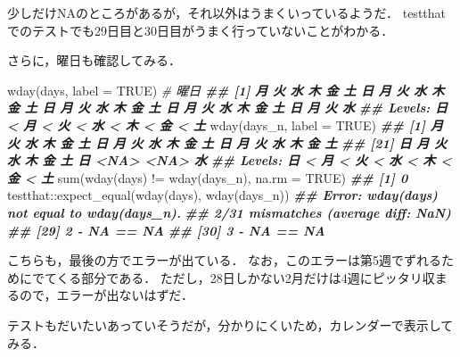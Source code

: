 \documentclass[
]{article}
\newenvironment{Shaded}{\begin{snugshade}}{\end{snugshade}}
\newcommand{\AttributeTok}[1]{\textcolor[rgb]{0.77,0.63,0.00}{#1}}
\newcommand{\CommentTok}[1]{\textcolor[rgb]{0.56,0.35,0.01}{\textit{#1}}}
\newcommand{\ConstantTok}[1]{\textcolor[rgb]{0.00,0.00,0.00}{#1}}
\newcommand{\DocumentationTok}[1]{\textcolor[rgb]{0.56,0.35,0.01}{\textbf{\textit{#1}}}}
\newcommand{\FunctionTok}[1]{\textcolor[rgb]{0.00,0.00,0.00}{#1}}
\newcommand{\NormalTok}[1]{#1}
\newcommand{\SpecialCharTok}[1]{\textcolor[rgb]{0.00,0.00,0.00}{#1}}
\begin{document}
少しだけNAのところがあるが，それ以外はうまくいっているようだ．
testthatでのテストでも29日目と30日目がうまく行っていないことがわかる．

さらに，曜日も確認してみる．

\begin{Shaded}
\begin{Highlighting}[]
\FunctionTok{wday}\NormalTok{(days, }\AttributeTok{label =} \ConstantTok{TRUE}\NormalTok{)   }\CommentTok{\# 曜日}
\DocumentationTok{\#\#  [1] 月 火 水 木 金 土 日 月 火 水 木 金 土 日 月 火 水 木 金 土 日 月 火 水 木 金 土 日 月 火 水}
\DocumentationTok{\#\# Levels: 日 \textless{} 月 \textless{} 火 \textless{} 水 \textless{} 木 \textless{} 金 \textless{} 土}
\FunctionTok{wday}\NormalTok{(days\_n, }\AttributeTok{label =} \ConstantTok{TRUE}\NormalTok{)}
\DocumentationTok{\#\#  [1] 月   火   水   木   金   土   日   月   火   水   木   金   土   日   月   火   水   木   金   土  }
\DocumentationTok{\#\# [21] 日   月   火   水   木   金   土   日   \textless{}NA\textgreater{} \textless{}NA\textgreater{} 水  }
\DocumentationTok{\#\# Levels: 日 \textless{} 月 \textless{} 火 \textless{} 水 \textless{} 木 \textless{} 金 \textless{} 土}
\FunctionTok{sum}\NormalTok{(}\FunctionTok{wday}\NormalTok{(days) }\SpecialCharTok{!=} \FunctionTok{wday}\NormalTok{(days\_n), }\AttributeTok{na.rm =} \ConstantTok{TRUE}\NormalTok{)}
\DocumentationTok{\#\# [1] 0}
\NormalTok{testthat}\SpecialCharTok{::}\FunctionTok{expect\_equal}\NormalTok{(}\FunctionTok{wday}\NormalTok{(days), }\FunctionTok{wday}\NormalTok{(days\_n))}
\DocumentationTok{\#\# Error: wday(days) not equal to wday(days\_n).}
\DocumentationTok{\#\# 2/31 mismatches (average diff: NaN)}
\DocumentationTok{\#\# [29] 2 {-} NA == NA}
\DocumentationTok{\#\# [30] 3 {-} NA == NA}
\end{Highlighting}
\end{Shaded}

こちらも，最後の方でエラーが出ている．
なお，このエラーは第5週でずれるためにでてくる部分である．
ただし，28日しかない2月だけは4週にピッタリ収まるので，エラーが出ないはずだ．

テストもだいたいあっていそうだが，分かりにくいため，カレンダーで表示してみる．
\end{document}
